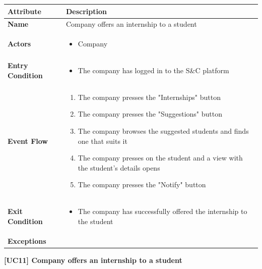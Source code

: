 \begin{center}
    
    \begin{tabular}{|p{3cm}|p{9cm}|}
    \hline
    \textbf{Attribute} & \textbf{Description} \\ \hline
    \textbf{Name} & Company offers an internship to a student \\ \hline
    \textbf{Actors} & 
    \begin{itemize}
        \item Company
    \end{itemize} \\ \hline
    \textbf{Entry Condition} & 
    \begin{itemize}
        \item The company has logged in to the S\&C platform
    \end{itemize}\\ \hline
    \textbf{Event Flow} & 
    \begin{enumerate}
        \item The company presses the "Internships" button 
        \item The company presses the "Suggestions" button
        \item The company browses the suggested students and finds one that suits it
        \item The company presses on the student and a view with the student's details opens
        \item The company presses the "Notify" button
    \end{enumerate} \\ \hline
    \textbf{Exit Condition} &
    \begin{itemize}
        \item The company has successfully offered the internship to the student
    \end{itemize} \\ \hline
    \textbf{Exceptions} & \\ \hline
    \end{tabular}
    \newline
    \newline
    \textbf{[UC11] Company offers an internship to a student}
    \newline
    \newline
    

\end{center}
